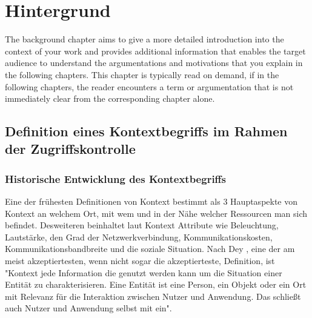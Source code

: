 
\chapter{Hintergrund}%
\label{cha:background}

The background chapter aims to give a more detailed introduction into the context of your work and provides additional information that enables the target audience to understand the argumentations and motivations that you explain in the following chapters.
This chapter is typically read on demand, if in the following chapters, the reader encounters a term or argumentation that is not immediately clear from the corresponding chapter alone.

\section{Definition eines Kontextbegriffs im Rahmen der Zugriffskontrolle}

\subsection{Historische Entwicklung des Kontextbegriffs}

Eine der frühesten Definitionen von Kontext \cite{schilit_context-aware_1994} bestimmt als 3 Hauptaspekte von Kontext an welchem Ort, mit wem und in der Nähe welcher Ressourcen man sich befindet.
Desweiteren beinhaltet laut \cite{schilit_context-aware_1994} Kontext Attribute wie Beleuchtung, Lautstärke, den Grad der Netzwerkverbindung, Kommunikationskosten, Kommunikationsbandbreite und die soziale Situation.
Nach Dey \cite{dey_understanding_2001}, eine der am meist akzeptiertesten, wenn nicht sogar die akzeptierteste, Definition, ist "Kontext jede Information die genutzt werden kann um die Situation einer Entität zu charakterisieren. Eine Entität ist eine Person, ein Objekt oder ein Ort mit Relevanz für die Interaktion zwischen Nutzer und Anwendung. Das schließt auch Nutzer und Anwendung selbst mit ein".

